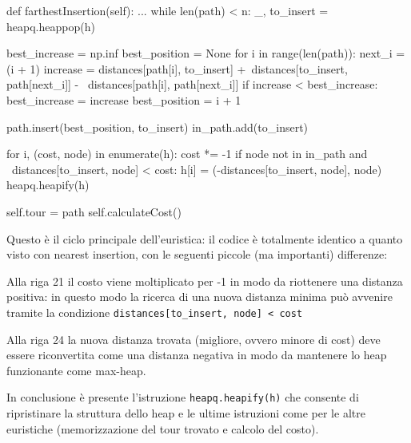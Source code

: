 \documentclass[a4paper,12pt]{report}
\begin{document}
  \begin{python}
  def farthestInsertion(self):
    ...
    while len(path) < n:
      _, to_insert = heapq.heappop(h)
  
      best_increase = np.inf
      best_position = None
      for i in range(len(path)):
        next_i = (i + 1) %
        increase = distances[path[i], to_insert] +\
                   distances[to_insert, path[next_i]] - \
                   distances[path[i], path[next_i]]
        if increase < best_increase:
          best_increase = increase
          best_position = i + 1
  
      path.insert(best_position, to_insert)
      in_path.add(to_insert)
  
      for i, (cost, node) in enumerate(h):
        cost *= -1
        if node not in in_path and \
           distances[to_insert, node] < cost:
          h[i] = (-distances[to_insert, node], node)
      heapq.heapify(h)
  
    self.tour = path
    self.calculateCost()
  \end{python}
Questo è il ciclo principale dell'euristica: il codice è totalmente identico a quanto visto con nearest insertion, con le seguenti piccole (ma importanti) differenze:
\begin{legal}
  \item Alla riga 21 il costo viene moltiplicato per -1 in modo da riottenere una distanza positiva: in questo modo la ricerca di una nuova distanza minima può avvenire tramite la condizione \lstinline!distances[to_insert, node] < cost!
  \item Alla riga 24 la nuova distanza trovata (migliore, ovvero minore di cost) deve essere riconvertita come una distanza negativa in modo da mantenere lo heap funzionante come max-heap.
\end{legal}
In conclusione è presente l'istruzione \lstinline!heapq.heapify(h)! che consente di ripristinare la struttura dello heap e le ultime istruzioni come per le altre euristiche (memorizzazione del tour trovato e calcolo del costo).
\end{document}

